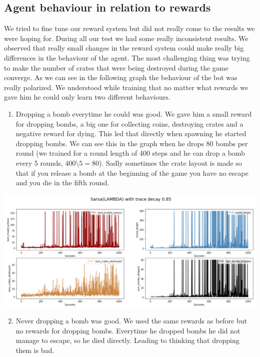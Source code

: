 \subsection{Agent behaviour in relation to rewards} \label{sub:agent_behaviour}
We tried to fine tune our reward system but did not really come to the results we were hoping for. During all our test we had some really inconsistent results. We observed that really small changes in the reward system could make really big differences in the behaviour of the agent. The most challenging thing was trying to make the number of crates that were being destroyed during the game converge. As we can see in the following graph the behaviour of the bot was really polarized. We understood while training that no matter what rewards we gave him he could only learn two different behaviours.
\begin{enumerate}
\item Dropping a bomb everytime he could was good. We gave him a small reward for dropping bombs, a big one for collecting coins, destroying crates and a negative reward for dying. This led that directly when spawning he started dropping bombs. We can see this in the graph when he drops 80 bombs per round (we trained for a round length of 400 steps and he can drop a bomb every 5 rounds, $400 \setminus5 = 80$). Sadly sometimes the crate layout is made so that if you release a bomb at the beginning of the game you have no escape and you die in the fifth round.
\end{enumerate}
\begin{center}
\includegraphics[scale=0.22]{graphics/plot05.png}
\end{center}
\begin{enumerate}
\setcounter{enumi}{1}
\item Never dropping a bomb was good. We used the same rewards as before but no rewards for dropping bombs. Everytime he dropped bombs he did not manage to escape, so he died directly. Leading to thinking that dropping them is bad.
\end{enumerate}
